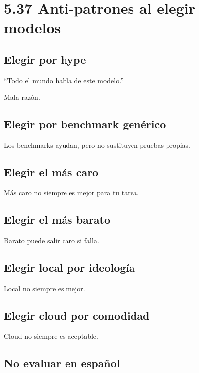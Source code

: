 \section{5.37 Anti-patrones al elegir
modelos}\label{anti-patrones-al-elegir-modelos}

\subsection{Elegir por hype}\label{elegir-por-hype}

``Todo el mundo habla de este modelo.''

Mala razón.

\subsection{Elegir por benchmark
genérico}\label{elegir-por-benchmark-genuxe9rico}

Los benchmarks ayudan, pero no sustituyen pruebas propias.

\subsection{Elegir el más caro}\label{elegir-el-muxe1s-caro}

Más caro no siempre es mejor para tu tarea.

\subsection{Elegir el más barato}\label{elegir-el-muxe1s-barato}

Barato puede salir caro si falla.

\subsection{Elegir local por
ideología}\label{elegir-local-por-ideologuxeda}

Local no siempre es mejor.

\subsection{Elegir cloud por
comodidad}\label{elegir-cloud-por-comodidad}

Cloud no siempre es aceptable.

\subsection{No evaluar en español}\label{no-evaluar-en-espauxf1ol}

